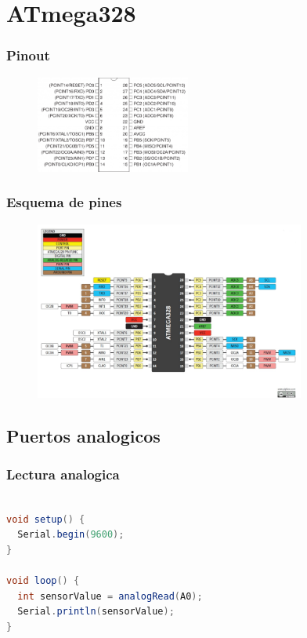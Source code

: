 \documentclass{beamer}
\begin{document}
\section{ATmega328}

\begin{frame}
\frametitle{Pinout}
\begin{figure}[!h]
\centering
\includegraphics[width=2in]{pinout}
\end{figure}
\end{frame}

\begin{frame}
\frametitle{Esquema de pines}
\begin{figure}[!h]
\centering
\includegraphics[width=3.5in]{atmega328}
\end{figure}
\end{frame}



\subsection{Puertos analogicos}

\begin{frame}[fragile]
\frametitle{Lectura analogica}
\begin{lstlisting}[language=java]

void setup() {
  Serial.begin(9600);
}

void loop() {
  int sensorValue = analogRead(A0);
  Serial.println(sensorValue);
}
\end{lstlisting}
\end{frame}

\begin{frame}[fragile]
\frametitle{}
\begin{lstlisting}[language=java]

\end{lstlisting}
\end{frame}

\begin{frame}
\frametitle{}

\end{frame}
\end{document}
